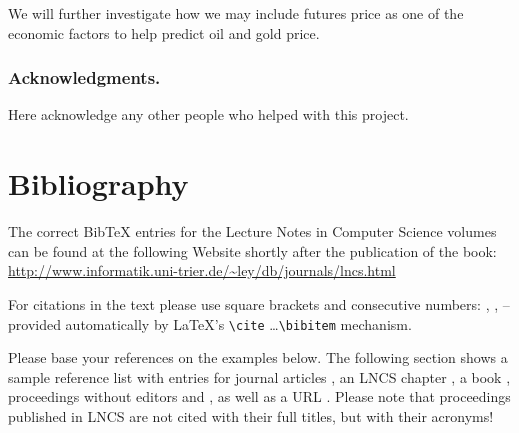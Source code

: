 \documentclass[runningheads]{llncs}
\begin{document}
\noindent We will further investigate how we may include futures price as one of the economic factors to help predict oil and gold price. \\


\subsubsection*{Acknowledgments.} Here acknowledge any other people who helped with this project.

\section{Bibliography}\label{references}

The correct BibTeX entries for the Lecture Notes in Computer Science
volumes can be found at the following Website shortly after the
publication of the book:
\url{http://www.informatik.uni-trier.de/~ley/db/journals/lncs.html}

For citations in the text please use
square brackets and consecutive numbers: \cite{jour}, \cite{lncschap},
\cite{proceeding1} -- provided automatically
by \LaTeX 's \verb|\cite| \dots\verb|\bibitem| mechanism.

Please base your references on the
examples below. 
The following section shows a sample reference list with entries for
journal articles \cite{jour}, an LNCS chapter \cite{lncschap}, a book
\cite{book}, proceedings without editors \cite{proceeding1} and
\cite{proceeding2}, as well as a URL \cite{url}.
Please note that proceedings published in LNCS are not cited with their
full titles, but with their acronyms!
\end{document}
